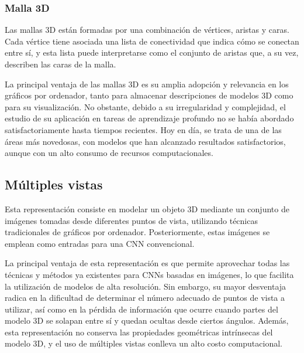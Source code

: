 \subsubsection{Malla 3D}
Las mallas 3D están formadas por una combinación de vértices, aristas y caras. Cada vértice tiene asociada una lista de conectividad que indica cómo se conectan entre sí, y esta lista puede interpretarse como el conjunto de aristas que, a su vez, describen las caras de la malla.

La principal ventaja de las mallas 3D es su amplia adopción y relevancia en los gráficos por ordenador, tanto para almacenar descripciones de modelos 3D como para su visualización. No obstante, debido a su irregularidad y complejidad, el estudio de su aplicación en tareas de aprendizaje profundo no se había abordado satisfactoriamente hasta tiempos recientes. Hoy en día, se trata de una de las áreas más novedosas, con modelos que han alcanzado resultados satisfactorios, aunque con un alto consumo de recursos computacionales.

\subsection{Múltiples vistas}
Esta representación consiste en modelar un objeto 3D mediante un conjunto de imágenes tomadas desde diferentes puntos de vista, utilizando técnicas tradicionales de gráficos por ordenador. Posteriormente, estas imágenes se emplean como entradas para una CNN convencional.

La principal ventaja de esta representación es que permite aprovechar todas las técnicas y métodos ya existentes para CNNs basadas en imágenes, lo que facilita la utilización de modelos de alta resolución. Sin embargo, su mayor desventaja radica en la dificultad de determinar el número adecuado de puntos de vista a utilizar, así como en la pérdida de información que ocurre cuando partes del modelo 3D se solapan entre sí y quedan ocultas desde ciertos ángulos. Además, esta representación no conserva las propiedades geométricas intrínsecas del modelo 3D, y el uso de múltiples vistas conlleva un alto costo computacional.